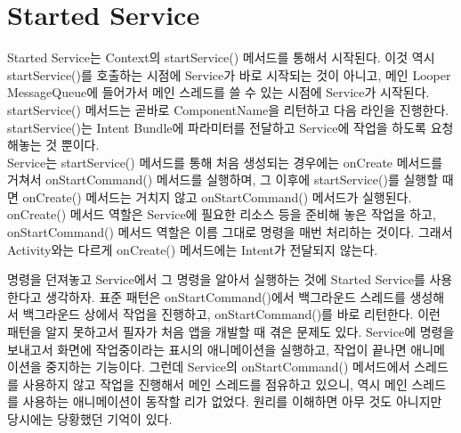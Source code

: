 \section{Started Service}
Started Service는 Context의 startService() 메서드를 통해서 시작된다. 이것 역시 startService()를 호출하는 시점에 Service가 바로 시작되는 것이 아니고, 메인 Looper MessageQueue에 들어가서 메인 스레드를 쓸 수 있는 시점에 Service가 시작된다. startService() 메서드는 곧바로 ComponentName을 리턴하고 다음 라인을 진행한다. startService()는 Intent Bundle에 파라미터를 전달하고 Service에 작업을 하도록 요청해놓는 것 뿐이다.\\

Service는 startService() 메서드를 통해 처음 생성되는 경우에는 onCreate 메서드를 거쳐서 onStartCommand() 메서드를 실행하며, 그 이후에 startService()를 실행할 때면 onCreate() 메서드는 거치지 않고 onStartCommand() 메서드가 실행된다.
onCreate() 메서드 역할은 Service에 필요한 리소스 등을 준비해 놓은 작업을 하고, onStartCommand() 메서드 역할은 이름 그대로 명령을 매번 처리하는 것이다. 그래서 Activity와는 다르게 onCreate() 메서드에는 Intent가 전달되지 않는다.\\

명령을 던져놓고 Service에서 그 명령을 알아서 실행하는 것에 Started Service를 사용한다고 생각하자.
표준 패턴은 onStartCommand()에서 백그라운드 스레드를 생성해서
백그라운드 상에서 작업을 진행하고, onStartCommand()를 바로 리턴한다. 이런 패턴을 알지 못하고서 필자가 처음 앱을 개발할 때 겪은 문제도 있다. Service에 명령을 보내고서 화면에 작업중이라는 표시의 애니메이션을 실행하고, 작업이 끝나면 애니메이션을 중지하는 기능이다. 
그런데 Service의  onStartCommand() 메서드에서 스레드를 사용하지 않고 작업을 진행해서 메인 스레드를 점유하고 있으니, 역시 메인 스레드를 사용하는 애니메이션이 동작할 리가 없었다. 원리를 이해하면 아무 것도 아니지만 당시에는 당황했던 기억이 있다.\\

